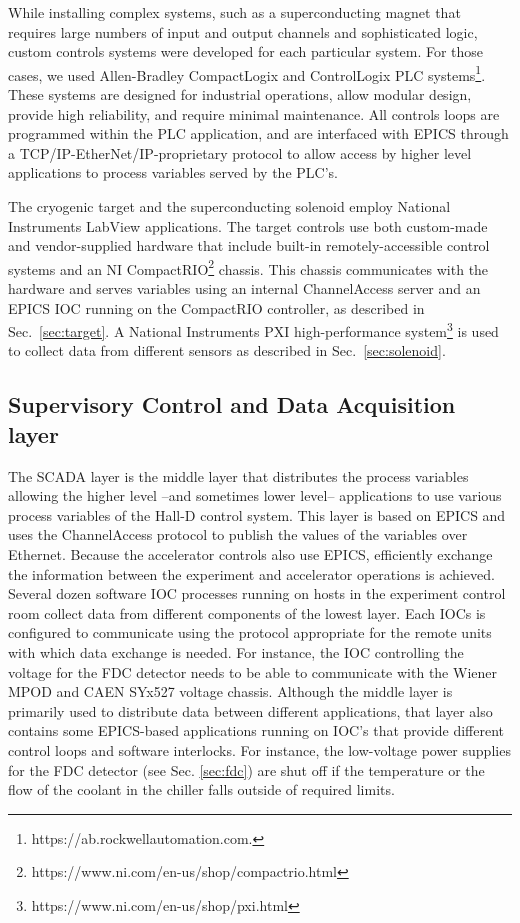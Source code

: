 While installing complex systems, such as a superconducting magnet that requires large numbers of input and output channels and sophisticated logic, custom controls systems were developed for each particular system. For those cases, we used Allen-Bradley CompactLogix and ControlLogix PLC systems\footnote{https://ab.rockwellautomation.com.}. These systems are designed for industrial operations, allow modular design, provide high reliability, and require minimal maintenance. All controls loops are programmed within the PLC application, and are interfaced with EPICS through a TCP/IP-EtherNet/IP-proprietary protocol to allow access by higher level applications to process variables served by the PLC's.  

The cryogenic target and the superconducting solenoid employ National Instruments LabView applications. The target controls use both custom-made and vendor-supplied hardware that include built-in remotely-accessible control systems and an NI CompactRIO\footnote{https://www.ni.com/en-us/shop/compactrio.html} chassis. This chassis communicates with the hardware and serves variables using an internal ChannelAccess server and an EPICS IOC running on the CompactRIO controller, as described in Sec.~\ref{sec:target}. A National Instruments PXI high-performance system\footnote{https://www.ni.com/en-us/shop/pxi.html} is used to collect data from different sensors as described in Sec.~\ref{sec:solenoid}. 

\subsection{Supervisory Control and Data Acquisition layer \label{sec:archiver}}
The SCADA layer is the middle layer that distributes the process variables allowing the higher level --and sometimes lower level-- applications to use various process variables of the Hall-D control system. This layer is based on EPICS and uses the ChannelAccess protocol to publish the values of the variables over Ethernet. Because the accelerator controls also use EPICS, efficiently exchange the information between the experiment and accelerator operations is achieved. Several dozen software IOC processes running on hosts in the experiment control room collect data from different components of the lowest layer. Each IOCs is configured to communicate using the protocol appropriate for the remote units with which data exchange is needed. For instance, the IOC controlling the voltage for the FDC detector needs to be able to communicate with the Wiener MPOD and CAEN SYx527 voltage chassis. Although the middle layer is primarily used to distribute data between different applications, that layer also contains some EPICS-based applications running on IOC's that provide different control loops and software interlocks.  For instance, the low-voltage power supplies for the FDC detector (see Sec. \ref{sec:fdc}) are shut off if the temperature or the flow of the coolant in the chiller falls outside of required limits. 
